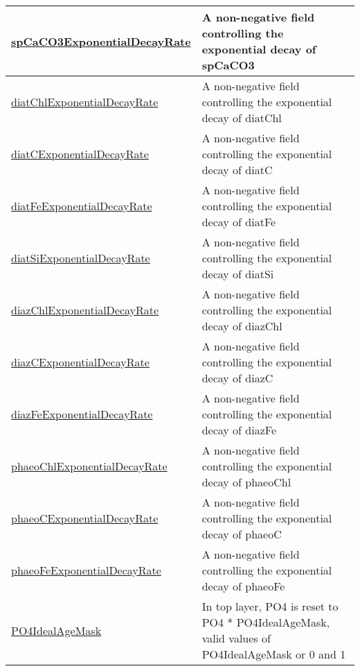 {\begin{center}
\begin{longtable}{| p{2.0in} | p{4.0in} |}
    \hline
    \hyperref[subsec:var_sec_forcing_spCaCO3ExponentialDecayRate]{spCaCO3ExponentialDecayRate} & A non-negative field controlling the exponential decay of spCaCO3 \\
    \hline
    \hyperref[subsec:var_sec_forcing_diatChlExponentialDecayRate]{diatChlExponentialDecayRate} & A non-negative field controlling the exponential decay of diatChl \\
    \hline
    \hyperref[subsec:var_sec_forcing_diatCExponentialDecayRate]{diatCExponentialDecayRate} & A non-negative field controlling the exponential decay of diatC \\
    \hline
    \hyperref[subsec:var_sec_forcing_diatFeExponentialDecayRate]{diatFeExponentialDecayRate} & A non-negative field controlling the exponential decay of diatFe \\
    \hline
    \hyperref[subsec:var_sec_forcing_diatSiExponentialDecayRate]{diatSiExponentialDecayRate} & A non-negative field controlling the exponential decay of diatSi \\
    \hline
    \hyperref[subsec:var_sec_forcing_diazChlExponentialDecayRate]{diazChlExponentialDecayRate} & A non-negative field controlling the exponential decay of diazChl \\
    \hline
    \hyperref[subsec:var_sec_forcing_diazCExponentialDecayRate]{diazCExponentialDecayRate} & A non-negative field controlling the exponential decay of diazC \\
    \hline
    \hyperref[subsec:var_sec_forcing_diazFeExponentialDecayRate]{diazFeExponentialDecayRate} & A non-negative field controlling the exponential decay of diazFe \\
    \hline
    \hyperref[subsec:var_sec_forcing_phaeoChlExponentialDecayRate]{phaeoChlExponentialDecayRate} & A non-negative field controlling the exponential decay of phaeoChl \\
    \hline
    \hyperref[subsec:var_sec_forcing_phaeoCExponentialDecayRate]{phaeoCExponentialDecayRate} & A non-negative field controlling the exponential decay of phaeoC \\
    \hline
    \hyperref[subsec:var_sec_forcing_phaeoFeExponentialDecayRate]{phaeoFeExponentialDecayRate} & A non-negative field controlling the exponential decay of phaeoFe \\
    \hline
    \hyperref[subsec:var_sec_forcing_PO4IdealAgeMask]{PO4IdealAgeMask} & In top layer, PO4 is reset to PO4 * PO4IdealAgeMask, valid values of PO4IdealAgeMask or 0 and 1 \\
    \hline

\end{longtable}
\end{center}}
